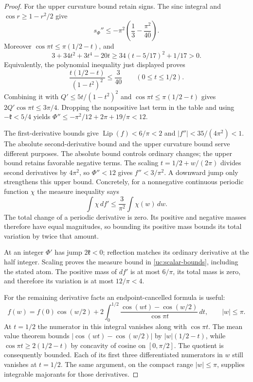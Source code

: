 \begin{proof}
For the upper curvature bound retain signs. The sinc integral and
$\cos r\geq1-r^2/2$ give
\[
 s_\Phi''\leq-\pi^2\left(\frac13-\frac{\pi^2}{40}\right).
\]
Moreover $\cos\pi t\leq\pi(1/2-t)$, and
\[
 3+34t^2+3t^4-20t
 \geq34(t-5/17)^2+1/17>0.
\]
Equivalently, the polynomial inequality just displayed proves
\[
 \frac{t(1/2-t)}{(1-t^2)^2}\leq\frac3{40}
 \qquad(0\leq t\leq1/2).
\]
Combining it with $Q'\leq5t/(1-t^2)^2$ and
$\cos\pi t\leq\pi(1/2-t)$ gives
$2Q'\cos\pi t\leq3\pi/4$. Dropping the nonpositive last
term in the table and using $-\mathfrak{k}<5/4$ yields
$\Phi''\leq-\pi^2/12+2\pi+19/\pi<12$.

The first-derivative bounds give $\operatorname{Lip}(f)<6/\pi<2$ and
$|f''|<35/(4\pi^2)<1$.
The absolute second-derivative bound and the upper curvature bound
serve different purposes. The absolute bound controls ordinary changes;
the upper bound retains favorable negative terms. The scaling
$t=1/2+w/(2\pi)$ divides second derivatives by $4\pi^2$, so
$\Phi''<12$ gives $f''<3/\pi^2$. A downward jump only strengthens
this upper bound. Concretely, for a nonnegative continuous periodic
function $\chi$ the measure inequality says
\[
 \int\chi\,df'\leq\frac3{\pi^2}\int\chi(w)\,dw.
\]
The total change of a periodic derivative is zero. Its positive and
negative masses therefore have equal magnitudes, so bounding its
positive mass bounds its total variation by twice that amount.

At an integer $\Phi'$ has jump $2\mathfrak{k}<0$; reflection matches its
ordinary derivative at the half integer. Scaling proves the measure
bound in \eqref{uc:scalar-bounds}, including the stated atom.
The positive mass of $df'$ is at most $6/\pi$, its total mass is
zero, and therefore its variation is at most $12/\pi<4$.

For the remaining derivative facts an endpoint-cancelled formula is
useful:
\begin{equation}\label{uc:f-integral}
 f(w)=f(0)\cos(w/2)+2\int_0^{1/2}
       \frac{\cos(wt)-\cos(w/2)}{\cos\pi t}\,dt,\qquad |w|\leq\pi.
\end{equation}
At $t=1/2$ the numerator in this integral vanishes along with
$\cos\pi t$. The mean value theorem bounds
$|\cos(wt)-\cos(w/2)|$ by $|w|(1/2-t)$, while
$\cos\pi t\geq2(1/2-t)$ by concavity of cosine on $[0,\pi/2]$.
The quotient is consequently bounded.
Each of its first three differentiated numerators in $w$ still
vanishes at $t=1/2$. The same argument, on the compact range
$|w|\leq\pi$, supplies integrable majorants for those derivatives.


\end{proof}

